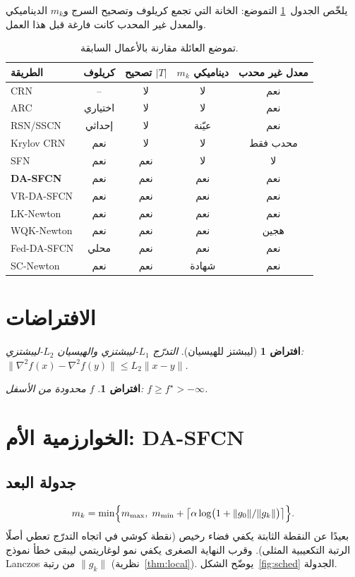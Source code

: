 \documentclass[12pt,a4paper]{article}
\newtheorem{assumption}[theorem]{افتراض}
\theoremstyle{definition}
\begin{document}
يلخّص الجدول~\ref{tab:gap} التموضع: الخانة التي تجمع كريلوف وتصحيح السرج
و$m_k$ الديناميكي والمعدل غير المحدب كانت فارغة قبل هذا العمل.

\begin{table}[t]
\centering
\caption{تموضع العائلة مقارنة بالأعمال السابقة.}
\label{tab:gap}
\small
\begin{tabular}{@{}lcccc@{}}
\toprule
الطريقة & كريلوف & تصحيح $|T|$ & $m_k$ ديناميكي & معدل غير محدب \\
\midrule
\textenglish{CRN} & -- & لا & لا & نعم \\
\textenglish{ARC} & اختياري & لا & لا & نعم \\
\textenglish{RSN/SSCN} & إحداثي & لا & عيّنة & نعم \\
\textenglish{Krylov CRN} & نعم & لا & لا & محدب فقط \\
\textenglish{SFN} & نعم & نعم & لا & لا \\
\textbf{\textenglish{DA-SFCN}} & نعم & نعم & نعم & نعم \\
\textenglish{VR-DA-SFCN} & نعم & نعم & نعم & نعم \\
\textenglish{LK-Newton} & نعم & نعم & نعم & نعم \\
\textenglish{WQK-Newton} & نعم & نعم & نعم & هجين \\
\textenglish{Fed-DA-SFCN} & محلي & نعم & نعم & نعم \\
\textenglish{SC-Newton} & نعم & نعم & شهادة & نعم \\
\bottomrule
\end{tabular}
\end{table}

\section{الافتراضات}
\begin{assumption}[ليبشتز للهيسيان]\label{ass:lip}
التدرّج $L_1$-ليبشتزي والهيسيان $L_2$-ليبشتزي:
$\|\nabla^2 f(x)-\nabla^2 f(y)\|\le L_2\|x-y\|$.
\end{assumption}
\begin{assumption}\label{ass:bound}
$f$ محدودة من الأسفل: $f\ge f^\star>-\infty$.
\end{assumption}

\section{الخوارزمية الأم: DA-SFCN}
\subsection{جدولة البعد}
\begin{equation}\label{eq:schedule}
m_k=\min\Bigl\{m_{\max},\;
m_{\min}+\bigl\lceil\alpha\log\bigl(1+\|g_0\|/\|g_k\|\bigr)\bigr\rceil\Bigr\}.
\end{equation}
بعيدًا عن النقطة الثابتة يكفي فضاء رخيص (نقطة كوشي في اتجاه التدرّج تعطي
أصلًا الرتبة التكعيبية المثلى). وقرب النهاية الصغرى يكفي نمو لوغاريتمي
ليبقى خطأ نموذج \textenglish{Lanczos} من رتبة $\|g_k\|$
(نظرية~\ref{thm:local}). يوضّح الشكل~\ref{fig:sched} الجدولة.
\end{document}
